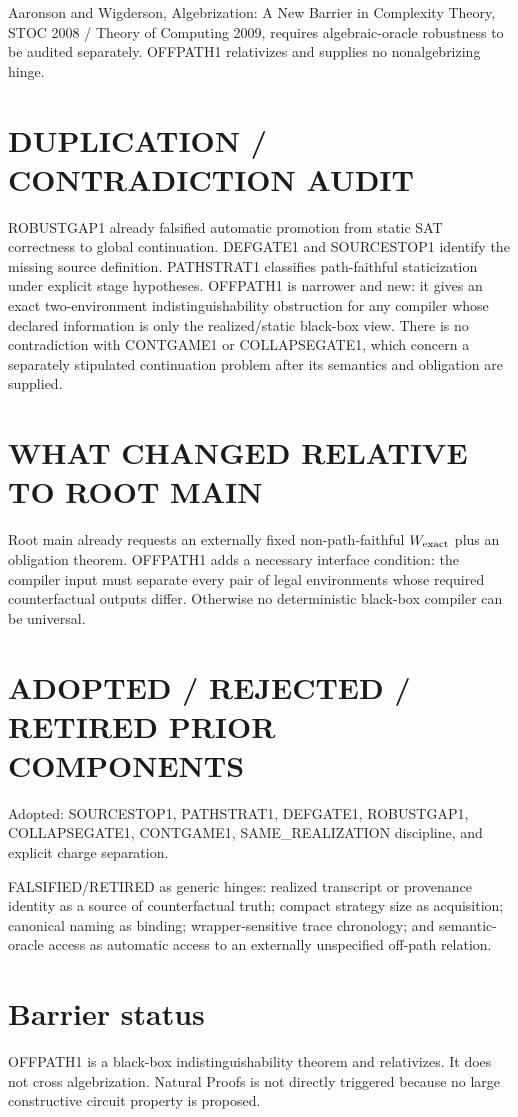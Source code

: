 \documentclass[11pt]{article}
\begin{document}
Aaronson and Wigderson, Algebrization: A New Barrier in Complexity Theory, STOC 2008 / Theory of Computing 2009, requires algebraic-oracle robustness to be audited separately. OFFPATH1 relativizes and supplies no nonalgebrizing hinge.

\section*{DUPLICATION / CONTRADICTION AUDIT}
ROBUSTGAP1 already falsified automatic promotion from static SAT correctness to global continuation. DEFGATE1 and SOURCESTOP1 identify the missing source definition. PATHSTRAT1 classifies path-faithful staticization under explicit stage hypotheses. OFFPATH1 is narrower and new: it gives an exact two-environment indistinguishability obstruction for any compiler whose declared information is only the realized/static black-box view. There is no contradiction with CONTGAME1 or COLLAPSEGATE1, which concern a separately stipulated continuation problem after its semantics and obligation are supplied.

\section*{WHAT CHANGED RELATIVE TO ROOT MAIN}
Root main already requests an externally fixed non-path-faithful \(W_{\rm exact}\) plus an obligation theorem. OFFPATH1 adds a necessary interface condition: the compiler input must separate every pair of legal environments whose required counterfactual outputs differ. Otherwise no deterministic black-box compiler can be universal.

\section*{ADOPTED / REJECTED / RETIRED PRIOR COMPONENTS}
Adopted: SOURCESTOP1, PATHSTRAT1, DEFGATE1, ROBUSTGAP1, COLLAPSEGATE1, CONTGAME1, SAME_REALIZATION discipline, and explicit charge separation.

FALSIFIED/RETIRED as generic hinges: realized transcript or provenance identity as a source of counterfactual truth; compact strategy size as acquisition; canonical naming as binding; wrapper-sensitive trace chronology; and semantic-oracle access as automatic access to an externally unspecified off-path relation.

\section*{Barrier status}
OFFPATH1 is a black-box indistinguishability theorem and relativizes. It does not cross algebrization. Natural Proofs is not directly triggered because no large constructive circuit property is proposed.
\end{document}
